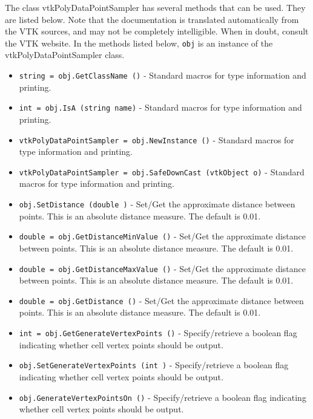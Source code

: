 The class vtkPolyDataPointSampler has several methods that can be used.
  They are listed below.
Note that the documentation is translated automatically from the VTK sources,
and may not be completely intelligible.  When in doubt, consult the VTK website.
In the methods listed below, \verb|obj| is an instance of the vtkPolyDataPointSampler class.
\begin{itemize}
\item  \verb|string = obj.GetClassName ()| -  Standard macros for type information and printing.

\item  \verb|int = obj.IsA (string name)| -  Standard macros for type information and printing.

\item  \verb|vtkPolyDataPointSampler = obj.NewInstance ()| -  Standard macros for type information and printing.

\item  \verb|vtkPolyDataPointSampler = obj.SafeDownCast (vtkObject o)| -  Standard macros for type information and printing.

\item  \verb|obj.SetDistance (double )| -  Set/Get the approximate distance between points. This is an absolute
 distance measure. The default is 0.01.

\item  \verb|double = obj.GetDistanceMinValue ()| -  Set/Get the approximate distance between points. This is an absolute
 distance measure. The default is 0.01.

\item  \verb|double = obj.GetDistanceMaxValue ()| -  Set/Get the approximate distance between points. This is an absolute
 distance measure. The default is 0.01.

\item  \verb|double = obj.GetDistance ()| -  Set/Get the approximate distance between points. This is an absolute
 distance measure. The default is 0.01.

\item  \verb|int = obj.GetGenerateVertexPoints ()| -  Specify/retrieve a boolean flag indicating whether cell vertex points should
 be output.

\item  \verb|obj.SetGenerateVertexPoints (int )| -  Specify/retrieve a boolean flag indicating whether cell vertex points should
 be output.

\item  \verb|obj.GenerateVertexPointsOn ()| -  Specify/retrieve a boolean flag indicating whether cell vertex points should
 be output.


\end{itemize}
